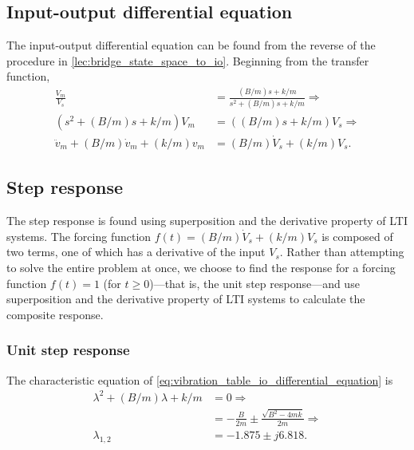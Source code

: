 \documentclass[dynamic_systems.tex]{subfiles}
\begin{document}
\subsection{Input-output differential equation}
\tags{}

The input-output differential equation can be found from the reverse of the procedure in \autoref{lec:bridge_state_space_to_io}.
Beginning from the transfer function,
\tags{}
\begin{subequations}
\begin{align}
	\frac{V_m}{V_s} &= \frac{(B/m) s + k/m}{s^2+(B/m) s + k/m} \Rightarrow \\
	\left(s^2+(B/m) s + k/m\right) V_m &= 
	\left((B/m) s + k/m\right) V_s \Rightarrow \\
	\ddot{v}_m + (B/m) \dot{v}_m + (k/m) v_m &=
	(B/m) \dot{V}_s + (k/m) V_s. \label{eq:vibration_table_io_differential_equation}
\end{align}
\end{subequations}

\subsection{Step response}
\tags

The step response is found using superposition and the derivative property of LTI systems.
The forcing function $f(t) = (B/m) \dot{V}_s + (k/m) V_s$ is composed of two terms, one of which has a derivative of the input $V_s$.
Rather than attempting to solve the entire problem at once, we choose to find the response for a forcing function $f(t) = 1$ (for $t\ge 0$)---that is, the unit step response---and use superposition and the derivative property of LTI systems to calculate the composite response.
\tags{}

\subsubsection{Unit step response}
\tags{}

The characteristic equation of \autoref{eq:vibration_table_io_differential_equation} is
\begin{subequations}
\begin{align}
	\lambda^2 + (B/m) \lambda + k/m &= 0 \Rightarrow \\
	&= -\frac{B}{2 m} \pm \frac{\sqrt{B^2 - 4 m k}}{2 m} \Rightarrow \\
	\lambda_{1,2}&= -1.875 \pm j 6.818.
\end{align}
\end{subequations}
\end{document}
